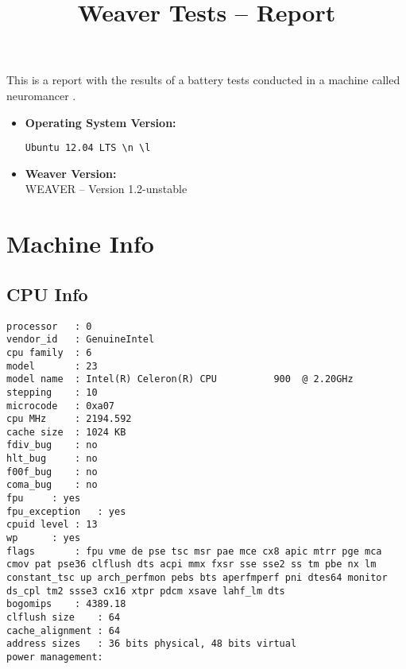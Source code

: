 \documentclass{article}
\title{Weaver Tests -- Report}
\begin{document}
\maketitle
This is a report with the results of a battery
tests conducted in a machine called 
neuromancer
.
\begin{itemize}
\item
\textbf{Operating System Version: }
\begin{verbatim}
Ubuntu 12.04 LTS \n \l

\end{verbatim}
\item
\textbf{Weaver Version: }\\
WEAVER -- Version 1.2-unstable
\end{itemize}
\section{Machine Info}
\subsection{CPU Info}
\begin{verbatim}
processor	: 0
vendor_id	: GenuineIntel
cpu family	: 6
model		: 23
model name	: Intel(R) Celeron(R) CPU          900  @ 2.20GHz
stepping	: 10
microcode	: 0xa07
cpu MHz		: 2194.592
cache size	: 1024 KB
fdiv_bug	: no
hlt_bug		: no
f00f_bug	: no
coma_bug	: no
fpu		: yes
fpu_exception	: yes
cpuid level	: 13
wp		: yes
flags		: fpu vme de pse tsc msr pae mce cx8 apic mtrr pge mca cmov pat pse36 clflush dts acpi mmx fxsr sse sse2 ss tm pbe nx lm constant_tsc up arch_perfmon pebs bts aperfmperf pni dtes64 monitor ds_cpl tm2 ssse3 cx16 xtpr pdcm xsave lahf_lm dts
bogomips	: 4389.18
clflush size	: 64
cache_alignment	: 64
address sizes	: 36 bits physical, 48 bits virtual
power management:

\end{verbatim}
\end{document}
